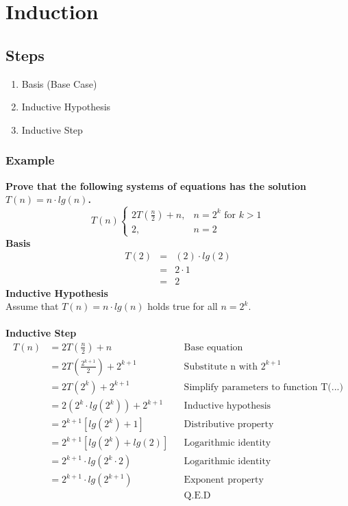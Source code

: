 \section{Induction}

\subsection{Steps}
\begin{enumerate}
	\item Basis (Base Case)
	\item Inductive Hypothesis
	\item Inductive Step
\end{enumerate}

\subsubsection{Example}
\textbf{Prove that the following systems of equations has the solution $T(n) = n \cdot lg(n)$.}
$$
T(n) \begin{cases}
	2T(\frac{n}{2}) + n, & n = 2^k \mbox{ for } k > 1\\
	2, & n = 2
\end{cases}
$$
\textbf{Basis}
\begin{eqnarray*}
T(2) &=& (2) \cdot lg(2)\\
	&=& 2 \cdot 1\\
	&=& 2
\end{eqnarray*}
\textbf{Inductive Hypothesis}\\
Assume that $T(n) = n \cdot lg(n)$ holds true for all $n = 2^k$.\\\\
\textbf{Inductive Step}
\begin{align*}
T(n)	&=	2T(\frac{n}{2}) + n						&& \text{Base equation}\\
		&= 	2T(\frac{2^{k+1}}{2}) + 2^{k+1}			&& \text{Substitute n with } 2^{k+1}\\
		&= 	2T(2^{k}) + 2^{k+1}						&& \text{Simplify parameters to function T(...)}\\
		&=	2(2^k \cdot lg(2^k)) + 2^{k+1}			&& \text{Inductive hypothesis}\\
		&=	2^{k+1} \left[ lg(2^k) + 1 \right]		&& \text{Distributive property}\\
		&=  2^{k+1} \left[ lg(2^k) + lg(2) \right]  && \text{Logarithmic identity}\\
		&= 	2^{k+1} \cdot lg(2^k \cdot 2)			&& \text{Logarithmic identity}\\
		&=  2^{k+1} \cdot lg(2^{k+1})				&& \text{Exponent property}\\
		&											&& \text{Q.E.D}
\end{align*}

